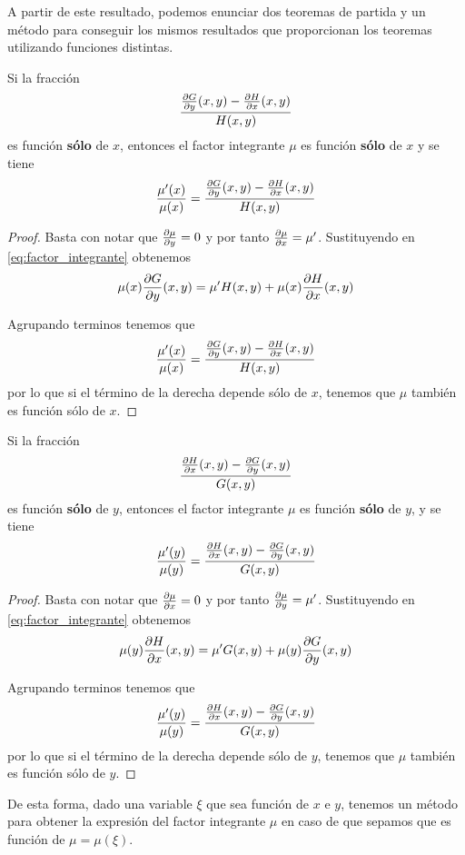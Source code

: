 A partir de este resultado, podemos enunciar dos teoremas de partida y un método para conseguir los mismos resultados que proporcionan los teoremas utilizando funciones distintas.

\begin{theorem}
Si la fracción $$\frac{\partialder{y}{G}(x,y)-\partialder{x}{H}(x,y)}{H(x,y)}$$ es función \textbf{sólo} de $x$, entonces el factor integrante $\mu$ es función \textbf{sólo} de $x$ y se tiene $$\frac{\mu^\prime(x)}{\mu(x)} = \frac{\partialder{y}{G}(x,y)-\partialder{x}{H}(x,y)}{H(x,y)}$$
\end{theorem}
\begin{proof}
Basta con notar que $\partialder{y}{\mu} = 0$ y por tanto $\partialder{x}{\mu} = \mu^\prime$.
Sustituyendo en \ref{eq:factor_integrante} obtenemos $$\mu(x)\partialder{y}{G}(x,y) = \mu^\prime H(x,y)+\mu(x) \partialder{x}{H}(x,y)$$

Agrupando terminos tenemos que
$$\frac{\mu^\prime(x)}{\mu(x)} = \frac{\partialder{y}{G}(x,y)-\partialder{x}{H}(x,y)}{H(x,y)}$$
por lo que si el término de la derecha depende sólo de $x$, tenemos que $\mu$ también es función sólo de $x$.
\end{proof}

\newpage
\begin{theorem}
Si la fracción $$\frac{\partialder{x}{H}(x,y)-\partialder{y}{G}(x,y)}{G(x,y)}$$ es función \textbf{sólo} de $y$, entonces el factor integrante $\mu$ es función \textbf{sólo} de $y$, y se tiene
$$\frac{\mu^\prime(y)}{\mu(y)} = \frac{\partialder{x}{H}(x,y)-\partialder{y}{G}(x,y)}{G(x,y)}$$
\end{theorem}

\begin{proof}
Basta con notar que $\partialder{x}{\mu} = 0$ y por tanto $\partialder{y}{\mu} = \mu^\prime$.
Sustituyendo en \ref{eq:factor_integrante} obtenemos $$\mu(y)\partialder{x}{H}(x,y) = \mu^\prime G(x,y)+\mu(y) \partialder{y}{G}(x,y)$$

Agrupando terminos tenemos que
$$\frac{\mu^\prime(y)}{\mu(y)} = \frac{\partialder{x}{H}(x,y)-\partialder{y}{G}(x,y)}{G(x,y)}$$
por lo que si el término de la derecha depende sólo de $y$, tenemos que $\mu$ también es función sólo de $y$.
\end{proof}

De esta forma, dado una variable $\xi$ que sea función de $x$ e $y$, tenemos un método para obtener la expresión del factor integrante $\mu$ en caso de que sepamos que es función de $\mu = \mu(\xi)$.

